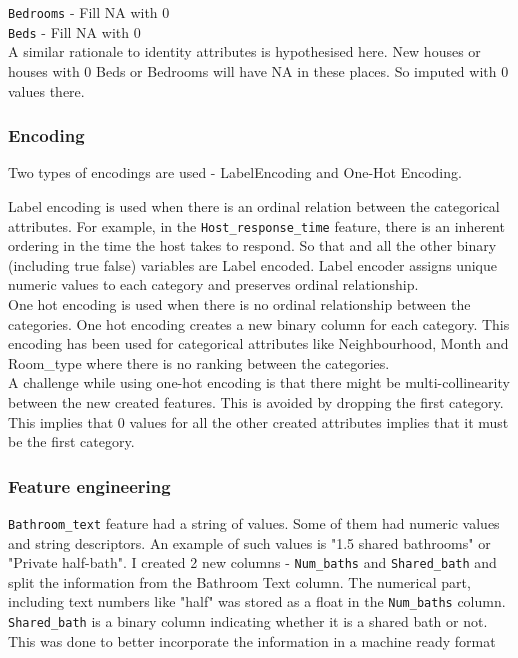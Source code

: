 \documentclass[12pt]{article}
\theoremstyle{definition}
\begin{document}
\texttt{Bedrooms} - Fill NA with 0\\
\texttt{Beds} - Fill NA with 0\\
A similar rationale to identity attributes is hypothesised here. New houses or houses with 0 Beds or Bedrooms will have NA in these places. So imputed with 0 values there.

\subsubsection{Encoding}
Two types of encodings are used - LabelEncoding and One-Hot Encoding.

Label encoding is used when there is an ordinal relation between the categorical attributes. For example, in the \texttt{Host\_response\_time} feature, there is an inherent ordering in the time the host takes to respond. So that and all the other binary (including true false) variables are Label encoded. Label encoder assigns unique numeric values to each category and preserves ordinal relationship.\\

One hot encoding is used when there is no ordinal relationship between the categories. One hot encoding creates a new binary column for each category. This encoding has been used for categorical attributes like Neighbourhood, Month and Room\_type where there is no ranking between the categories. \\

A challenge while using one-hot encoding is that there might be multi-collinearity between the new created features. This is avoided by dropping the first category. This implies that 0 values for all the other created attributes implies that it must be the first category. 

\subsubsection{Feature engineering}
\texttt{Bathroom\_text} feature had a string of values. Some of them had numeric values and string descriptors. An example of such values is "1.5 shared bathrooms" or "Private half-bath". I created 2 new columns - \texttt{Num\_baths} and \texttt{Shared\_bath} and split the information from the Bathroom Text column. The numerical part, including text numbers like "half" was stored as a float in the \texttt{Num\_baths} column. \texttt{Shared\_bath} is a binary column indicating whether it is a shared bath or not. This was done to better incorporate the information in a machine ready format\\
\end{document}
